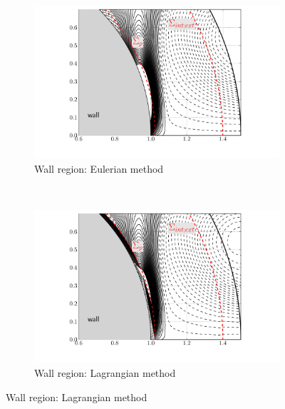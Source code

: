	\begin{figure}[!p]
     \centering
     \begin{subfigure}[t]{0.49\textwidth}
             \includegraphics[width=\textwidth]{./figures/hybrid/isc/hisc_EulerianDomain_wall.pdf}
             \caption{Wall region: Eulerian method}
             \label{fig:hisc_EulerianDomain_wall}
     \end{subfigure}%
     ~ %
     \begin{subfigure}[t]{0.49\textwidth}
             \includegraphics[width=\textwidth]{./figures/hybrid/isc/hisc_LagrangianDomain_wall.pdf}
             \caption{Wall region: Lagrangian method}
             \label{fig:hisc_LagrangianDomain_wall}
     \end{subfigure}
     

\end{figure}
